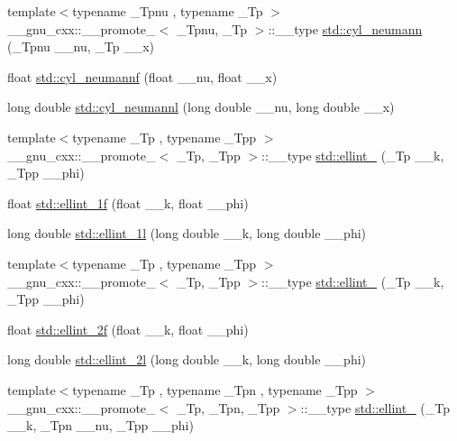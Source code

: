 \begin{DoxyCompactItemize}
\item 
{\footnotesize template$<$typename \+\_\+\+Tpnu , typename \+\_\+\+Tp $>$ }\\\+\_\+\+\_\+gnu\+\_\+cxx\+::\+\_\+\+\_\+promote\+\_$<$ \+\_\+\+Tpnu, \+\_\+\+Tp $>$\+::\+\_\+\+\_\+type \hyperlink{group__tr29124__math__spec__func_ga5b7c72ab85e361cbd73f1a3b5f0725a6}{std\+::cyl\+\_\+neumann} (\+\_\+\+Tpnu \+\_\+\+\_\+nu, \+\_\+\+Tp \+\_\+\+\_\+x)
\item 
float \hyperlink{group__tr29124__math__spec__func_ga604c13e8f2bb7cd3c7c91d8b19d6b13a}{std\+::cyl\+\_\+neumannf} (float \+\_\+\+\_\+nu, float \+\_\+\+\_\+x)
\item 
long double \hyperlink{group__tr29124__math__spec__func_gaf8986bae9a523c48d861d233835bda8f}{std\+::cyl\+\_\+neumannl} (long double \+\_\+\+\_\+nu, long double \+\_\+\+\_\+x)
\item 
{\footnotesize template$<$typename \+\_\+\+Tp , typename \+\_\+\+Tpp $>$ }\\\+\_\+\+\_\+gnu\+\_\+cxx\+::\+\_\+\+\_\+promote\+\_$<$ \+\_\+\+Tp, \+\_\+\+Tpp $>$\+::\+\_\+\+\_\+type \hyperlink{group__tr29124__math__spec__func_gae6b3df5556f38a7d72f9b4457d856f9c}{std\+::ellint\+\_} (\+\_\+\+Tp \+\_\+\+\_\+k, \+\_\+\+Tpp \+\_\+\+\_\+phi)
\item 
float \hyperlink{group__tr29124__math__spec__func_ga308d23d70f4b5e848eb7a4173628ef3b}{std\+::ellint\+\_\+1f} (float \+\_\+\+\_\+k, float \+\_\+\+\_\+phi)
\item 
long double \hyperlink{group__tr29124__math__spec__func_ga795383fa51e02351000b410b478d824f}{std\+::ellint\+\_\+1l} (long double \+\_\+\+\_\+k, long double \+\_\+\+\_\+phi)
\item 
{\footnotesize template$<$typename \+\_\+\+Tp , typename \+\_\+\+Tpp $>$ }\\\+\_\+\+\_\+gnu\+\_\+cxx\+::\+\_\+\+\_\+promote\+\_$<$ \+\_\+\+Tp, \+\_\+\+Tpp $>$\+::\+\_\+\+\_\+type \hyperlink{group__tr29124__math__spec__func_gad6dd71db2b3f90d24ff49bf8cf37bc37}{std\+::ellint\+\_} (\+\_\+\+Tp \+\_\+\+\_\+k, \+\_\+\+Tpp \+\_\+\+\_\+phi)
\item 
float \hyperlink{group__tr29124__math__spec__func_ga594a730163c6228c75b152462700062b}{std\+::ellint\+\_\+2f} (float \+\_\+\+\_\+k, float \+\_\+\+\_\+phi)
\item 
long double \hyperlink{group__tr29124__math__spec__func_ga5c791332d374a809d8ca16c69a1a30f5}{std\+::ellint\+\_\+2l} (long double \+\_\+\+\_\+k, long double \+\_\+\+\_\+phi)
\item 
{\footnotesize template$<$typename \+\_\+\+Tp , typename \+\_\+\+Tpn , typename \+\_\+\+Tpp $>$ }\\\+\_\+\+\_\+gnu\+\_\+cxx\+::\+\_\+\+\_\+promote\+\_$<$ \+\_\+\+Tp, \+\_\+\+Tpn, \+\_\+\+Tpp $>$\+::\+\_\+\+\_\+type \hyperlink{group__tr29124__math__spec__func_ga20832e3a67d25cc3d415cafc88019ac3}{std\+::ellint\+\_} (\+\_\+\+Tp \+\_\+\+\_\+k, \+\_\+\+Tpn \+\_\+\+\_\+nu, \+\_\+\+Tpp \+\_\+\+\_\+phi)

\end{DoxyCompactItemize}
